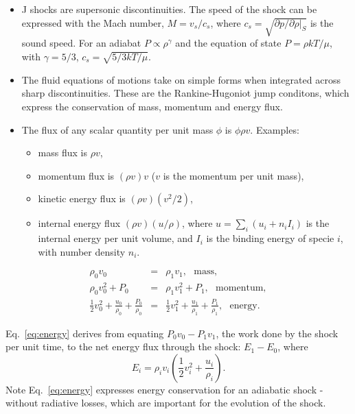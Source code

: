
\begin{itemize}

\item J shocks are supersonic discontinuities. The speed of the shock
  can be expressed with the Mach number, $M = v_s/c_s$, where $c_s =
  \sqrt{\partial p / \partial \rho |_S }$ is the sound speed. For an
  adiabat $P \propto \rho^\gamma$ and the equation of state $P = \rho
  k T / \mu$, with $\gamma = 5/3$, $c_s = \sqrt{5/3 k T / \mu}$.

\item The fluid equations of motions take on simple forms when
  integrated across sharp discontinuities. These are the
  Rankine-Hugoniot jump conditons, which express the conservation of
  mass, momentum and energy flux.

\item The flux of any scalar quantity per unit mass $\phi$ is $\phi
  \rho v$. Examples: 
\begin{itemize}
\item mass flux is $\rho v$, 
\item momentum flux is $(\rho v)
  v$ ($v$ is the momentum per unit mass), 
\item kinetic energy flux is  $(\rho v) (v^2 / 2)$,
\item internal energy flux  $(\rho v) (u / \rho)$, where $u = \sum_i
  (u_i + n_i I_i)$ is the internal energy per unit volume, and $I_i$ is
  the binding energy of specie $i$, with number density $n_i$. 

\end{itemize}
\end{itemize}


\begin{eqnarray}
\rho_0 v_0  & =  & \rho_1 v_1, ~~~ \text{mass} , \\
\rho_0 v_0^2 + P_0   & =  & \rho_1 v_1^2 + P_1, ~~~ \text{momentum} , \\
\frac{1}{2} v_0^2 + \frac{u_0}{\rho_0} + \frac{P_0}{\rho_0}   & =  & 
\frac{1}{2} v_1^2 + \frac{u_1}{\rho_1} + \frac{P_1}{\rho_1}
, ~~~ \text{energy}. \label{eq:energy}
\end{eqnarray}

Eq.~\ref{eq:energy} derives from equating $P_0 v_0 - P_1 v_1 $, the
work done by the shock per unit time, to the net energy flux through
the shock: $E_1 - E_0$, where \[ E_i = \rho_i v_i \left(\frac{1}{2}
v_i^2 + \frac{u_i}{\rho_i}\right) . \] Note Eq.~\ref{eq:energy}
expresses energy conservation for an adiabatic shock - without
radiative losses, which are important for the evolution of the shock.


